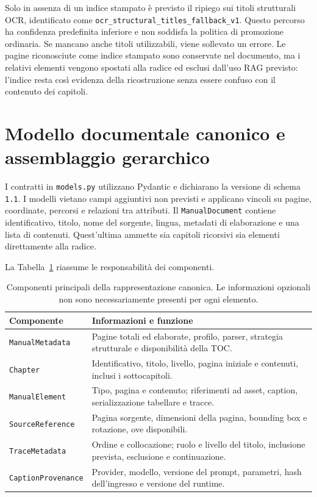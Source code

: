 Solo in assenza di un indice stampato è previsto il ripiego sui titoli strutturali OCR, identificato come \texttt{ocr\_structural\_titles\_fallback\_v1}. Questo percorso ha confidenza predefinita inferiore e non soddisfa la politica di promozione ordinaria. Se mancano anche titoli utilizzabili, viene sollevato un errore. Le pagine riconosciute come indice stampato sono conservate nel documento, ma i relativi elementi vengono spostati alla radice ed esclusi dall'uso RAG previsto: l'indice resta così evidenza della ricostruzione senza essere confuso con il contenuto dei capitoli.

\section{Modello documentale canonico e assemblaggio gerarchico}
\label{sec:manual-json}

I contratti in \texttt{models.py} utilizzano Pydantic e dichiarano la versione di schema \texttt{1.1}. I modelli vietano campi aggiuntivi non previsti e applicano vincoli su pagine, coordinate, percorsi e relazioni tra attributi. Il \texttt{ManualDocument} contiene identificativo, titolo, nome del sorgente, lingua, metadati di elaborazione e una lista di contenuti. Quest'ultima ammette sia capitoli ricorsivi sia elementi direttamente alla radice.

La Tabella~\ref{tab:contratti-ingestion} riassume le responsabilità dei componenti.

\begin{table}[!htbp]
\centering
\caption{Componenti principali della rappresentazione canonica. Le informazioni opzionali non sono necessariamente presenti per ogni elemento.}
\label{tab:contratti-ingestion}
\small
\begin{tabularx}{\textwidth}{@{}p{}X@{}}
\toprule
Componente & Informazioni e funzione \\
\midrule
\texttt{ManualMetadata} & Pagine totali ed elaborate, profilo, parser, strategia strutturale e disponibilità della TOC. \\
\texttt{Chapter} & Identificativo, titolo, livello, pagina iniziale e contenuti, inclusi i sottocapitoli. \tabularnewline
\texttt{ManualElement} & Tipo, pagina e contenuto; riferimenti ad asset, caption, serializzazione tabellare e tracce. \tabularnewline
\texttt{SourceReference} & Pagina sorgente, dimensioni della pagina, bounding box e rotazione, ove disponibili. \\
\texttt{TraceMetadata} & Ordine e collocazione; ruolo e livello del titolo, inclusione prevista, esclusione e continuazione. \tabularnewline
\texttt{CaptionProvenance} & Provider, modello, versione del prompt, parametri, hash dell'ingresso e versione del runtime. \\
\bottomrule
\end{tabularx}
\end{table}


